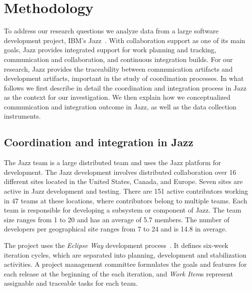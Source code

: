 \documentclass[12pt,oneside]{book}
\newcommand{\et}[1]{\emph{#1}}
\begin{document}
\section{Methodology}
\label{sec:Methodology}

To address our research questions we analyze data from a large software
development project, IBM's Jazz~\cite{frost:ieeesoftware:2007}. With collaboration support
as one of its main goals, Jazz provides integrated support for work planning and
tracking, communication and collaboration, and continuous integration builds. For
our research, Jazz provides the traceability between communication artifacts and
development artifacts, important in the study of coordination processes. In what
follows we first describe in detail the coordination and integration process in
Jazz as the context for our investigation. We then explain how we conceptualized
communication and integration outcome in Jazz, as well as the data collection
instruments.


\subsection{Coordination and integration in Jazz}
The Jazz team is a large distributed team and uses the Jazz platform for
development. The Jazz development involves distributed collaboration over 16
different sites located in the United States, Canada, and Europe. Seven sites are
active in Jazz development and testing. There are 151 active contributors
working in 47 teams at these locations, where contributors belong to multiple
teams. Each team is responsible for developing a subsystem or component of Jazz.
The team size ranges from 1 to 20 and has an average of 5.7 members. The number
of developers per geographical site ranges from 7 to 24 and is 14.8 in average.

The project uses the \emph{Eclipse Way} development process~\cite{frost:ieeesoftware:2007}.
It defines six-week iteration cycles, which are separated into planning,
development and stabilization activities. A project management committee
formulates the goals and features for each release at the beginning of the each
iteration, and \et{Work Item}s represent assignable and traceable tasks for each
team.
\end{document}
